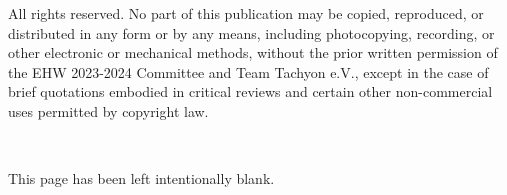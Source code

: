 \documentclass[a4paper, twoside,  12pt]{article}
\newcommand{\blankpage}{
  \thispagestyle{nobgpagestyle}
  \begin{center}
    \vspace*{\fill}
    This page has been left intentionally blank.
    \vspace*{\fill}
  \end{center}
  \newpage
}
\begin{document}
All rights reserved. No part of this publication may be copied, reproduced, or distributed in any form or by any means, including photocopying, recording, or other electronic or mechanical methods, without the prior written permission of the EHW 2023-2024 Committee and Team Tachyon e.V., except in the case of brief quotations embodied in critical reviews and certain other non-commercial uses permitted by copyright law.

\begin{center}
    {\huge {}}\\
\end{center}

\newpage
\blankpage




\setlength\bibitemsep{\baselineskip} %

\printbibliography
\end{document}
